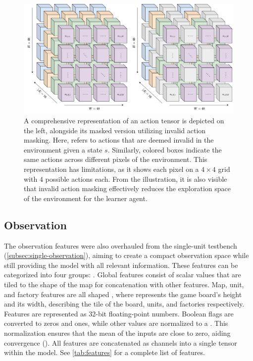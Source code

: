 \begin{figure}[htbp]
    \centering
    \includegraphics[width=0.7\linewidth]{images/methods_mono/action/action_space.png}
    \captionsetup{justification=justified, singlelinecheck=false, width=1\linewidth, labelfont=bf} 
    \caption[]{A comprehensive representation of an action tensor is depicted on the left, alongside its masked version utilizing invalid action masking. Here,  refers to actions that are deemed invalid in the environment given a state $s$. Similarly, colored boxes indicate the same actions across different pixels of the environment. This representation has limitations, as it shows each pixel on a $4\times4$ grid with $4$ possible actions each. From the illustration, it is also visible that invalid action masking effectively reduces the exploration space of the environment for the learner agent.}
    \label{fig:action_space_mono}
\end{figure}



\subsection{Observation}
\label{subsec:mono-observation}

\noindent The observation features were also overhauled from the single-unit testbench (\autoref{subsec:single-observation}), aiming to create a compact observation space while still providing the model with all relevant information. These features can be categorized into four groups: . Global features consist of scalar values that are tiled to the shape of the map for concatenation with other features. Map, unit, and factory features are all shaped , where  represents the game board's height and  its width, describing the tile of the board, units, and factories respectively. Features are represented as 32-bit floating-point numbers. Boolean flags are converted to zeros and ones, while other values are normalized to a . This normalization ensures that the mean of the inputs are close to zero, aiding convergence (\cite{Normalization}). All features are concatenated as channels into a single tensor within the model. See \autoref{tab:features} for a complete list of features.

